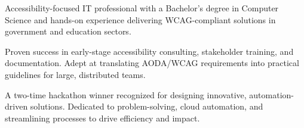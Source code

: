 
\begin{cvparagraph}

Accessibility-focused IT professional with a Bachelor’s degree in Computer Science and hands-on experience delivering WCAG-compliant solutions in government and education sectors. 

Proven success in early-stage accessibility consulting, stakeholder training, and documentation. Adept at translating AODA/WCAG requirements into practical guidelines for large, distributed teams.

A two-time hackathon winner recognized for designing innovative, automation-driven solutions. Dedicated to problem-solving, cloud automation, and streamlining processes to drive efficiency and impact.  

\end{cvparagraph}
